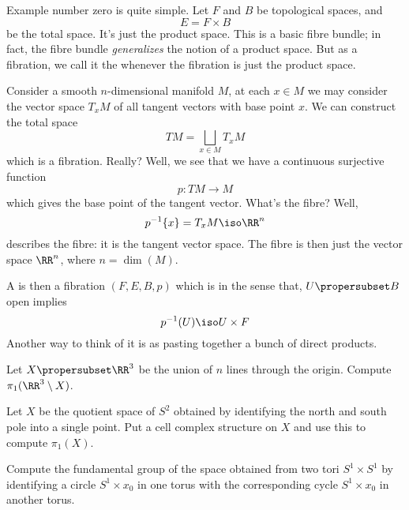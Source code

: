 \begin{ex}
Example number zero is quite simple. Let $F$ and $B$ be
topological spaces, and
\begin{equation}
E=F\times B
\end{equation}
be the total space. It's just the product space. This is a basic
fibre bundle; in fact, the fibre bundle \emph{generalizes} the
notion of a product space. But as a fibration, we call it
the 
whenever the fibration is just the product space.
\end{ex}
\begin{ex}
Consider a smooth $n$-dimensional manifold $M$, at each $x\in M$ we may consider
the vector space $T_{x}M$ of all tangent vectors with base point
$x$. We can construct the total space
\begin{equation}
TM = \bigsqcup_{x\in M}T_{x}M
\end{equation}
which is a fibration. Really? Well, we see that we have a
continuous surjective function
\begin{equation}
p\colon TM\to M
\end{equation}
which gives the base point of the tangent vector. What's the
fibre? Well,
\begin{equation}
p^{-1}\{x\}=T_{x}M\iso\RR^{n}
\end{equation}
describes the fibre: it is the tangent vector space. The fibre is
then just the vector space $\RR^n$, where $n=\dim(M)$.
\end{ex}

A 
is then a fibration $(F,E,B,p)$ which is 
in the sense that, $U\propersubset B$ open implies
\begin{equation}
p^{-1}(U)\iso U\times F
\end{equation}
Another way to think of it is as pasting together a bunch of
direct products.
\exercises
\begin{xca}
Let $X\propersubset\RR^3$ be the union of $n$ lines through the
origin. Compute $\pi_{1}(\RR^3\setminus X)$.
\end{xca}
\begin{xca}
Let $X$ be the quotient space of $S^2$ obtained by identifying
the north and south pole into a single point. Put a cell complex
structure on $X$ and use this to compute $\pi_{1}(X)$.
\end{xca}
\begin{xca}
Compute the fundamental group of the space obtained from two tori
$S^{1}\times S^{1}$ by identifying a circle $S^{1}\times x_{0}$
in one torus with the corresponding cycle $S^{1}\times x_{0}$ in
another torus. 
\end{xca}
